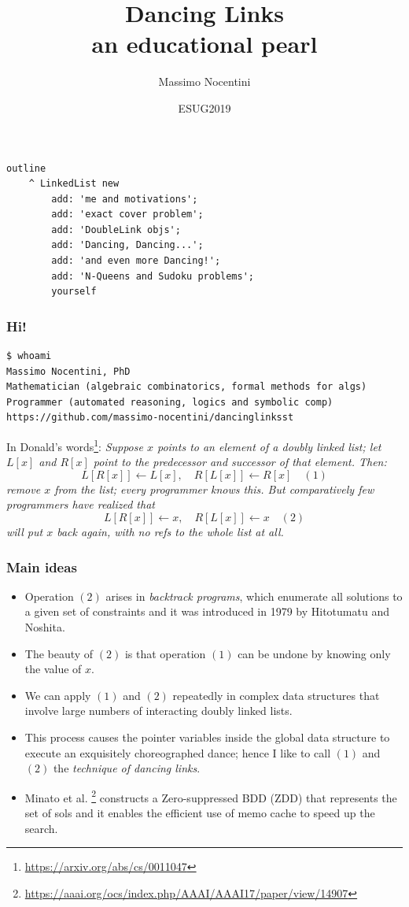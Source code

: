 \documentclass[10pt]{beamer}
\title{Dancing Links\\\small{an educational pearl}}
\author{Massimo Nocentini}
\institute{University of Florence, Italy}
\date{ESUG2019 }
\begin{document}
\frame{\titlepage}

\begin{frame}[fragile]
\frametitle{}
\begin{verbatim}
outline
    ^ LinkedList new
        add: 'me and motivations';
        add: 'exact cover problem';
        add: 'DoubleLink objs';
        add: 'Dancing, Dancing...';
        add: 'and even more Dancing!';
        add: 'N-Queens and Sudoku problems';
        yourself
\end{verbatim}
\end{frame}

\begin{frame}[fragile]
\frametitle{Hi!}
\begin{Verbatim}[fontsize=\small]
$ whoami
Massimo Nocentini, PhD
Mathematician (algebraic combinatorics, formal methods for algs)
Programmer (automated reasoning, logics and symbolic comp)
https://github.com/massimo-nocentini/dancinglinksst
\end{Verbatim}
\vfill
In Donald's words\footnote{\url{https://arxiv.org/abs/cs/0011047}}:
\emph{
Suppose $x$ points to an element of a doubly linked list;
let $L[x]$ and $R[x]$ point to the predecessor and successor
of that element. Then:
\begin{displaymath}
  L[R[x]] \leftarrow L[x],\quad R[L[x]] \leftarrow R[x] \quad(1)
\end{displaymath}
remove $x$ from the list; every programmer knows this.
But comparatively few programmers have realized that
\begin{displaymath}
  L[R[x]] \leftarrow x,\quad R[L[x]] \leftarrow x \quad(2)
\end{displaymath}
will put $x$ back again, with no refs to the whole list at all.
}

\end{frame}

\begin{frame}[fragile]
\frametitle{Main ideas}

\begin{itemize}
  \item Operation $(2)$ arises in \textit{backtrack programs}, which enumerate all 
  solutions to a given set of constraints and it was introduced in 1979 by Hitotumatu and Noshita.
  \item The beauty of $(2)$ is that operation $(1)$ can be undone by knowing only the value of $x$.
  \item We can apply $(1)$ and $(2)$ repeatedly in complex data structures that involve large 
  numbers of interacting doubly linked lists.
  \item This process causes the pointer variables inside the global data structure to execute an 
  exquisitely choreographed dance; hence I like to call $(1)$ and $(2)$ the \textit{technique of dancing links}.
  \item Minato et al. \footnote{\url{https://aaai.org/ocs/index.php/AAAI/AAAI17/paper/view/14907}} 
  constructs a Zero-suppressed BDD (ZDD) that represents the set of sols and it enables the efficient 
  use of memo cache to speed up the search.
\end{itemize}
\end{frame}
\end{document}
